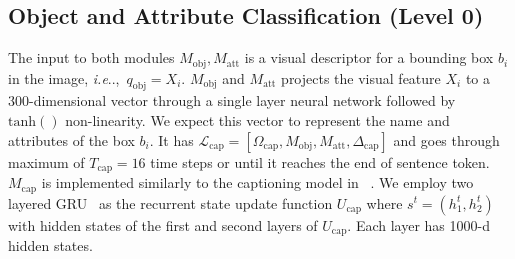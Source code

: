 \documentclass{article}
\makeatletter
\newcommand{\SK}[1]{{\color{NavyBlue}{[@Seung: #1]}}}
\def\E{\mathcal{E}}
\def\Mobj{M_\mathrm{obj}}
\def\Matt{M_\mathrm{att}}
\def\Mcap{M_\mathrm{cap}}
\DeclareRobustCommand\onedot{\futurelet\@let@token\@onedot}
\def\@onedot{\ifx\@let@token.\else.\null\fi\xspace}
\def\ie{\emph{i.e}\onedot} \def\Ie{\emph{I.e}\onedot}
\makeatother
\begin{document}
\subsection{Object and Attribute Classification (Level 0)}
The input to both modules $\Mobj, \Matt$ is a visual descriptor for a bounding box $b_i$ in the image, \ie,~$q_\mathrm{obj} = X_i$.
$\Mobj$ and $\Matt$ projects the visual feature $X_i$ to a 300-dimensional vector through a single layer neural network followed by $\mathrm{tanh}()$ non-linearity.
We expect this vector to represent the name and attributes of the box $b_i$.
It has $\mathcal L_\mathrm{cap} = [\Omega_{\mathrm{cap}}, \Mobj, \Matt, \Delta_{\mathrm{cap}}]$ and goes through maximum of $T_\mathrm{cap}=16$ time steps or until it reaches the end of sentence token.
$\Mcap$ is implemented similarly to the captioning model in ~\citet{anderson17}.
We employ two layered GRU~\citep{cho14} as the recurrent state update function $U_\mathrm{cap}$ where $s^t = (h^t_1, h^t_2)$ with hidden states of the first and second layers of $U_\mathrm{cap}$. Each layer has 1000-d hidden states.
\end{document}
